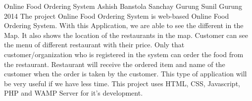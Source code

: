  \begin{conf-abstract}[]
{Online Food Ordering System}
{
Ashish Banstola
Sanchay Gurung
Sunil Gurung
}
{2014}
The project Online Food Ordering System is web-based Online Food Ordering System. With this Application, we are able to see the different in the Map. It also shows the location of the restaurants in the map. Customer can see the menu of different restaurant with their price. Only that customer/organization who is registered in the system can order the food from the restaurant. Restaurant will receive the ordered item and name of the customer when the order is taken by the customer. This type of application will be very useful if we have less time. This project uses HTML, CSS, Javascript, PHP and WAMP Server for it's development.
  \end{conf-abstract}